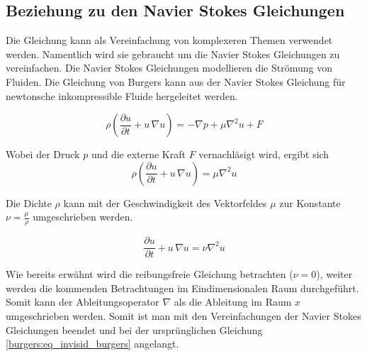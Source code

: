	
	\subsection{Beziehung zu den Navier Stokes Gleichungen}
		Die Gleichung kann als Vereinfachung von komplexeren Themen verwendet werden.
		Namentlich wird sie gebraucht um die Navier Stokes Gleichungen zu vereinfachen.
		Die Navier Stokes Gleichungen modellieren die Str\"omung von Fluiden.
		Die Gleichung von Burgers kann aus der Navier Stokes Gleichung f\"ur newtonsche inkompressible Fluide hergeleitet werden. \cite{burgers:navier}
		
		
		\begin{equation}
			\rho \left(\frac{\partial u}{\partial t} + u \, \nabla u \right) = -\nabla p + \mu \nabla^2 u + F 	
			\label{burgers:eq_navier}
		\end{equation}
		
		Wobei der Druck $p$ und die externe Kraft $F$ vernachl\"asigt wird, ergibt sich
		\begin{equation}
			\rho \left(\frac{\partial u}{\partial t} + u \, \nabla u \right) = \mu \nabla^2 u
			 \label{burgers:eq_navier2}
		\end{equation}
		
		Die Dichte $\rho$ kann mit der Geschwindigkeit des Vektorfeldes $\mu$ zur Konstante $\nu = \frac{\mu}{\rho}$ umgeschrieben werden.
		
		\begin{equation}
			 \frac{\partial u}{\partial t} + u \,\nabla u = \nu \nabla^2 u 
			 \label{burgers:eq_navier3}
		\end{equation}
		
		Wie bereits erw\"ahnt wird die reibungsfreie Gleichung betrachten ($\nu = 0$), weiter werden die kommenden Betrachtungen im Eindimensionalen Raum durchgef\"uhrt.
		Somit kann der Ableitungsoperator $\nabla$ als die Ableitung im Raum $x$ umgeschrieben werden.
		Somit ist man mit den Vereinfachungen der Navier Stokes Gleichungen beendet und bei der urspr\"unglichen Gleichung \eqref{burgers:eq_invisid_burgers} angelangt.
	
		